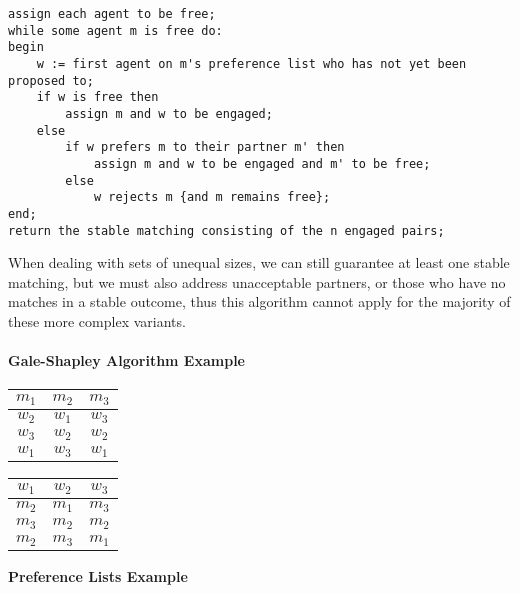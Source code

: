\begin{verbatim}
assign each agent to be free;
while some agent m is free do:
begin 
    w := first agent on m's preference list who has not yet been proposed to;
    if w is free then
        assign m and w to be engaged;
    else 
        if w prefers m to their partner m' then
            assign m and w to be engaged and m' to be free;
        else
            w rejects m {and m remains free};
end;
return the stable matching consisting of the n engaged pairs;
\end{verbatim} 

When dealing with sets of unequal sizes, we can still guarantee at least one stable matching, but we must also address unacceptable partners, or those who have no matches in a stable outcome, thus this algorithm cannot apply for the majority of these more complex variants. \cite{gusfield}

\paragraph{Gale-Shapley Algorithm Example}

\begin{center}
\begin{tabular}{||c c c||} 
 \hline
  $m_1$ & $m_2$ & $m_3$ \\ [0.5ex] 
 \hline\hline
 $w_2$ & $w_1$ & $w_3$ \\
 \hline
 $w_3$ & $w_2$ & $w_2$ \\
 \hline
 $w_1$ & $w_3$ & $w_1$ \\ [1ex] 
 \hline
\end{tabular}
\end{center}

\begin{center}
\begin{tabular}{||c c c||} 
 \hline
  $w_1$ & $w_2$ & $w_3$ \\ [0.5ex] 
 \hline\hline
 $m_2$ & $m_1$ & $m_3$ \\
 \hline
 $m_3$ & $m_2$ & $m_2$ \\
 \hline
 $m_2$ & $m_3$ & $m_1$ \\[1ex] 
 \hline
\end{tabular}
\end{center}

\begin{center}
    \textbf{Preference Lists Example}
\end{center}

\begin{center}
\end{center}

